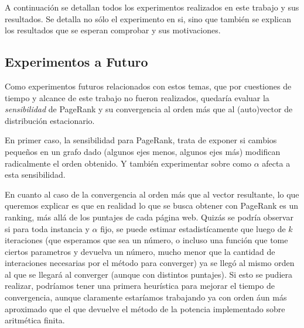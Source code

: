 \par A continuaci\'on se detallan todos los experimentos realizados en este
trabajo y sus resultados. Se detalla no s\'olo el experimento en si, sino que
tambi\'en se explican los resultados que se esperan comprobar y sus
motivaciones.



\newpage


\newpage


\newpage


\newpage


\newpage


\newpage


\newpage


\newpage
\subsection{Experimentos a Futuro}
\par Como experimentos futuros relacionados con estos temas, que por cuestiones
de tiempo y alcance de este trabajo no fueron realizados, quedaría evaluar la
\emph{sensibilidad} de PageRank y su convergencia al orden m\'as que al
(auto)vector de distribuci\'on estacionario.

\par En primer caso, la sensibilidad para PageRank, trata de exponer si cambios
peque\~nos en un grafo dado (algunos ejes menos, algunos ejes m\'as) modifican
radicalmente el orden obtenido. Y tambi\'en experimentar sobre como $\alpha$
afecta a esta sensibilidad.

\par En cuanto al caso de la convergencia al orden m\'as que al vector
resultante, lo que queremos explicar es que en realidad lo que se busca obtener
con PageRank es un ranking, m\'as all\'a de los puntajes de cada p\'agina web.
Quizás se podr\'ia observar si para toda instancia y $\alpha$ fijo, se puede
estimar estadist\'icamente que luego de $k$ iteraciones (que esperamos que sea
un n\'umero, o incluso una funci\'on que tome ciertos parametros y devuelva un
n\'umero, mucho menor que la cantidad de interaciones necesarias por el
m\'etodo para converger) ya se lleg\'o al mismo orden al que se llegar\'a al
converger (aunque con distintos puntajes). Si esto se pudiera realizar,
podr\'iamos tener una primera heur\'istica para mejorar el tiempo de
convergencia, aunque claramente estar\'iamos trabajando ya con orden \'aun m\'as
aproximado que el que devuelve el m\'etodo de la potencia implementado sobre
aritm\'etica finita.
